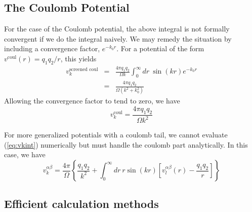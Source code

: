 \subsection{The Coulomb Potential}
For the case of the Coulomb potential, the above integral is not
formally convergent if we do the integral naively. We may remedy the
situation by including a convergence factor, $e^{-k_0 r}$.  For a
potential of the form $v^\text{coul}(r) = q_1 q_2/r$, this yields
\begin{eqnarray}
v^{\text{screened coul}}_k & = & \frac{4\pi q_1 q_2}{\Omega k} \int_0^\infty dr\ \sin(kr)
e^{-k_0r} \\ 
& = & \frac{4\pi q_1 q_2}{\Omega (k^2 + k_0^2)}
\end{eqnarray}
Allowing the convergence factor to tend to zero, we have
\begin{equation}
v_k^\text{coul} = \frac{4 \pi q_1 q_2}{\Omega k^2}
\end{equation}

For more generalized potentials with a coulomb tail, we cannot
evaluate (\ref{eq:vkint}) numerically but must handle the coulomb part
analytically.  In this case, we have
\begin{equation}
v_k^{\alpha \beta} = \frac{4\pi}{\Omega} 
\left\{ \frac{q_1 q_2}{k^2} + \int_0^\infty dr \ r \sin(kr) \left[ v_l^{\alpha \beta}(r) -
  \frac{q_1 q_2}{r} \right] \right\}
\end{equation}

\subsection{Efficient calculation methods}
